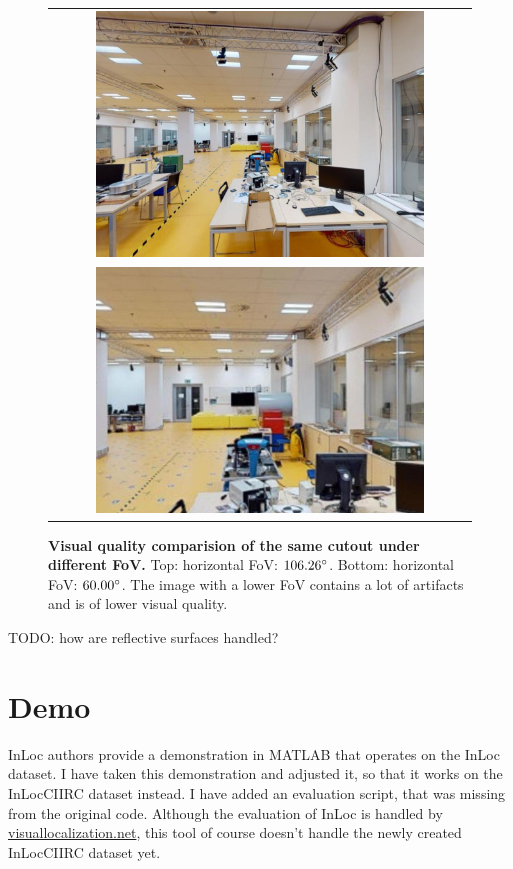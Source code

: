 \documentclass[twoside]{ctuthesis}
\theoremstyle{plain}
\theoremstyle{definition}
\theoremstyle{note}
\begin{document}
\begin{figure}
    \centering
    {
    \begin{tabular}{c}
    \includegraphics[width=0.8\textwidth]{cutout_19_-90_0_FoV106} \\
    \includegraphics[width=0.8\textwidth]{cutout_19_-90_0_FoV60}
    \end{tabular}
	\caption{{\bf Visual quality comparision of the same cutout under different FoV.} Top: horizontal FoV: $106.26\degree$. Bottom: horizontal FoV: $60.00\degree$. The image with a lower FoV contains a lot of artifacts and is of lower visual quality.}
	\label{fig:fov-quality}
    }
\end{figure}

TODO: how are reflective surfaces handled?

\chapter{Demo}

InLoc \cite{taira2018inloc} authors provide a demonstration in MATLAB that operates on the InLoc dataset. I have taken this demonstration and adjusted it, so that it works on the InLocCIIRC dataset instead. I have added an evaluation script, that was missing from the original code. Although the evaluation of InLoc is handled by \url{visuallocalization.net}, this tool of course doesn't handle the newly created InLocCIIRC dataset yet.
\end{document}
